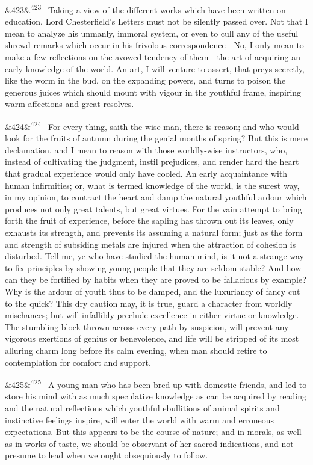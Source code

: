 \documentclass[12pt]{article}
\newcommand{\para}[1][]{\par\noindent\ifx&#1&\else\textsuperscript{\footnotesize #1}~\fi}
\begin{document}
\para[423] Taking a view of the different works which have been written on education, Lord Chesterfield's Letters must not be silently passed over. Not that I mean to analyze his unmanly, immoral system, or even to cull any of the useful shrewd remarks which occur in his frivolous correspondence---No, I only mean to make a few reflections on the avowed tendency of them---the art of acquiring an early knowledge of the world. An art, I will venture to assert, that preys secretly, like the worm in the bud, on the expanding powers, and turns to poison the generous juices which should mount with vigour in the youthful frame, inspiring warm affections and great resolves.

\para[424] For every thing, saith the wise man, there is reason; and who would look for the fruits of autumn during the genial months of spring? But this is mere declamation, and I mean to reason with those worldly-wise instructors, who, instead of cultivating the judgment, instil prejudices, and render hard the heart that gradual experience would only have cooled. An early acquaintance with human infirmities; or, what is termed knowledge of the world, is the surest way, in my opinion, to contract the heart and damp the natural youthful ardour which produces not only great talents, but great virtues. For the vain attempt to bring forth the fruit of experience, before the sapling has thrown out its leaves, only exhausts its strength, and prevents its assuming a natural form; just as the form and strength of subsiding metals are injured when the attraction of cohesion is disturbed. Tell me, ye who have studied the human mind, is it not a strange way to fix principles by showing young people that they are seldom stable? And how can they be fortified by habits when they are proved to be fallacious by example? Why is the ardour of youth thus to be damped, and the luxuriancy of fancy cut to the quick? This dry caution may, it is true, guard a character from worldly mischances; but will infallibly preclude excellence in either virtue or knowledge. The stumbling-block thrown across every path by suspicion, will prevent any vigorous exertions of genius or benevolence, and life will be stripped of its most alluring charm long before its calm evening, when man should retire to contemplation for comfort and support.

\para[425] A young man who has been bred up with domestic friends, and led to store his mind with as much speculative knowledge as can be acquired by reading and the natural reflections which youthful ebullitions of animal spirits and instinctive feelings inspire, will enter the world with warm and erroneous expectations. But this appears to be the course of nature; and in morals, as well as in works of taste, we should be observant of her sacred indications, and not presume to lead when we ought obsequiously to follow.
\end{document}
